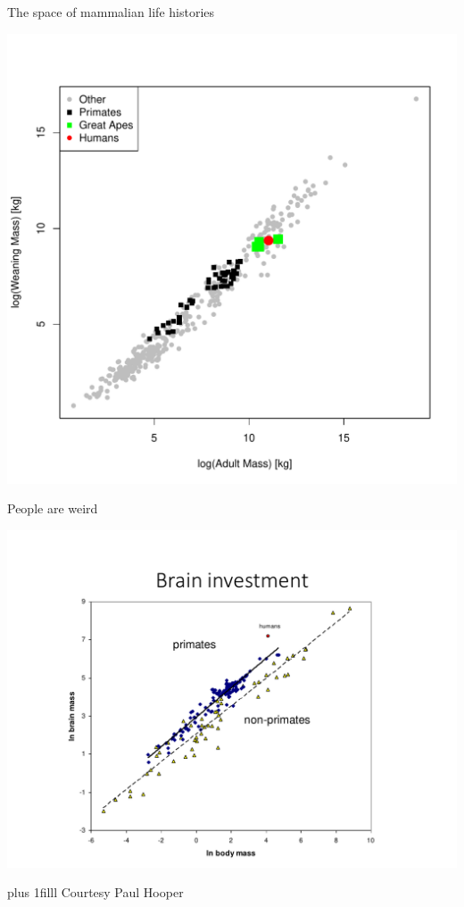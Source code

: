 \documentclass{beamer}
\newcommand{\btVFill}{\vskip0pt plus 1filll}
\begin{document}
\begin{frame}{The space of mammalian life histories}
  \begin{center}
    \includegraphics[width=.7\textwidth]{weaning_mass.pdf}
  \end{center}
\end{frame}

\begin{frame}{People are weird}
  \begin{center}
    \includegraphics[page=1,width=.8\textwidth]{hooper_slides_condensed2.pdf}
  \end{center}
  \btVFill
  \small Courtesy Paul Hooper\normalsize
\end{frame}
\end{document}
